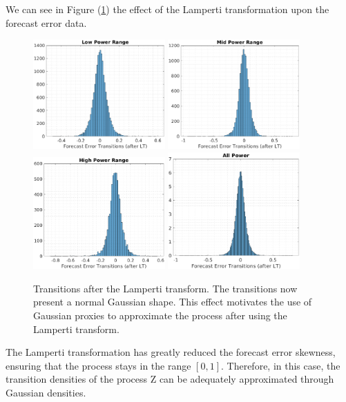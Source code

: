\documentclass[11pt]{article}
\theoremstyle{definition}
\begin{document}
{\color{red}We can see in Figure (\ref{fig:LP_transitions}) the effect of the Lamperti transformation upon the forecast error data. 

\begin{figure}[H]
\centering
\includegraphics[width=0.45\textwidth]{plots/LP_t_LP.eps}
\includegraphics[width=0.45\textwidth]{plots/MP_t_LP.eps}\\
\includegraphics[width=0.45\textwidth]{plots/HP_t_LP.eps}
\includegraphics[width=0.45\textwidth]{plots/AP_t_LP.eps}
\caption{Transitions after the Lamperti transform. The transitions now present a normal Gaussian shape. This effect motivates the use of Gaussian proxies to approximate the process after using the Lamperti transform.}
  \label{fig:LP_transitions}
\end{figure}

The Lamperti transformation has greatly reduced the forecast error skewness, ensuring that the process stays in the range $[0,1]$. Therefore, in this case, the transition densities of the process Z can be adequately approximated through Gaussian densities.}
\end{document}
